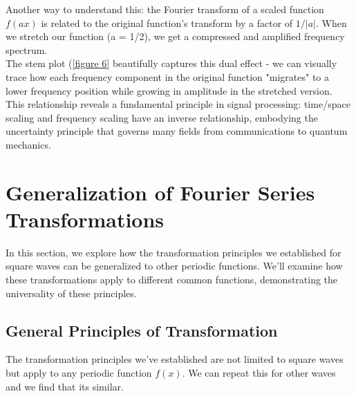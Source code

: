 \documentclass{article}
\begin{document}
Another way to understand this: the Fourier transform of a scaled function $f(ax)$ is related to the original function's transform by a factor of $1/|a|$. When we stretch our function (a = 1/2), we get a compressed and amplified frequency spectrum.\\

The stem plot (\ref{figure 6} beautifully captures this dual effect - we can visually trace how each frequency component in the original function "migrates" to a lower frequency position while growing in amplitude in the stretched version.\\

This relationship reveals a fundamental principle in signal processing: time/space scaling and frequency scaling have an inverse relationship, embodying the uncertainty principle that governs many fields from communications to quantum mechanics.

\section{Generalization of Fourier Series Transformations}
In this section, we explore how the transformation principles we established for square waves can be generalized to other periodic functions. We'll examine how these transformations apply to different common functions, demonstrating the universality of these principles.

\subsection{General Principles of Transformation}
The transformation principles we've established are not limited to square waves but apply to any periodic function $f(x)$. We can repeat this for other waves and we find that its similar.
\end{document}
